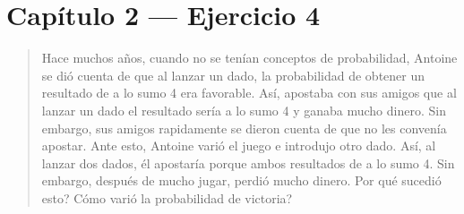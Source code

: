 \documentclass[11pt]{article}
\begin{document}
\section*{Capítulo 2 --- Ejercicio 4}

\begin{quote}
Hace muchos años, cuando no se tenían conceptos de probabilidad, Antoine se dió cuenta de que al
lanzar un dado, la probabilidad de obtener un resultado de a lo sumo 4 era favorable. Así,
apostaba con sus amigos que al lanzar un dado el resultado sería a lo sumo 4 y ganaba mucho
dinero. Sin embargo, sus amigos rapidamente se dieron cuenta de que no les convenía apostar.
Ante esto, Antoine varió el juego e introdujo otro dado. Así, al lanzar dos dados, él apostaría
porque ambos resultados de a lo sumo 4. Sin embargo, después de mucho jugar, perdió mucho
dinero. Por qué sucedió esto? Cómo varió la probabilidad de victoria?
\end{quote}
\end{document}
